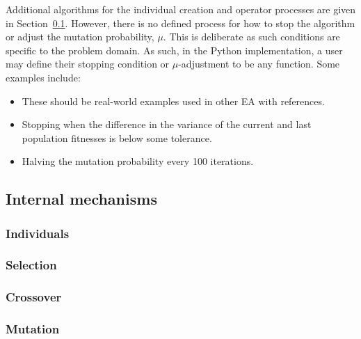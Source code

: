 Additional algorithms for the individual creation and operator processes are
given in Section~\ref{subsection:mechanisms}. However, there is no defined
process for how to stop the algorithm or adjust the mutation probability,
\(\mu\). This is deliberate as such conditions are specific to the problem
domain. As such, in the Python implementation, a user may define their stopping
condition or \(\mu\)-adjustment to be any function. Some examples include:

\begin{itemize}
    \item These should be real-world examples used in other EA with references.
    \item Stopping when the difference in the variance of the current and last
        population fitnesses is below some tolerance.
    \item Halving the mutation probability every 100 iterations.
\end{itemize}
        

\subsection{Internal mechanisms}\label{subsection:mechanisms}

\subsubsection{Individuals}


\subsubsection{Selection}


\subsubsection{Crossover}


\subsubsection{Mutation}

